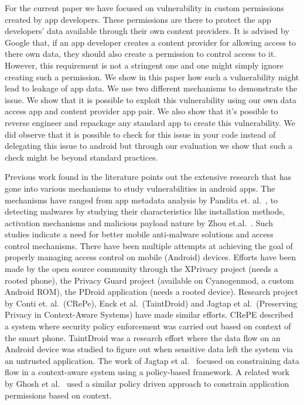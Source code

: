 For the current paper we have focused on vulnerability in custom permissions created by app developers. These permissions are there to protect the app developers' data available through their own content providers. It is advised by Google that, if an app developer creates a content provider for allowing access to there own data, they should also create a permission to control access to it. However, this requirement is not a stringent one and one might simply ignore creating such a permission. We show in this paper how such a vulnerability might lead to leakage of app data. We use two different mechanisms to demonstrate the issue. We show that it is possible to exploit this vulnerability using our own data access app and content provider app pair. We also show that it's possible to reverse engineer and repackage any standard app to create this vulnerability. We did observe that it is possible to check for this issue in your code instead of delegating this issue to android but through our evaluation we show that such a check might be beyond standard practices. 

Previous work found in the literature points out the extensive research that has gone into various mechanisms to study vulnerabilities in android apps. The mechanisms have ranged from app metadata analysis by Pandita et. al.~\cite{Pandita2013Whyper}, to detecting malwares by studying their characteristics like installation methods, activation mechanisms and malicious payload nature by Zhou et.al.~\cite{Zhou2012MalwareGenomeProject}. Such studies indicate a need for better mobile anti-malware solutions and access control mechanisms. There have been multiple attempts at achieving the goal of properly managing access control on mobile (Android) devices. Efforts have been made by the open source community through the XPrivacy project (needs a rooted phone), the Privacy Guard project (available on Cyanogenmod, a custom Android ROM), the PDroid application (needs a rooted device). Research project by Conti et. al.~\cite{conti2011crepe}(CRePe), Enck et al.~\cite{enck2010taintdroid}(TaintDroid) and Jagtap et al.~\cite{Jagtap2011Privacy}(Preserving Privacy in Context-Aware Systems) have made similar efforts. CRePE described a system where security policy enforcement was carried out based on context of the smart phone. TaintDroid was a research effort where the data flow on an Android device was studied to figure out when sensitive data left the system via an untrusted application. The work of Jagtap et al.~\cite{Jagtap2011Privacy} focused on constraining data flow in a context-aware system using a policy-based framework. A related work by Ghosh et al.~\cite{ghosh2012privacy} used a similar policy driven approach to constrain application permissions based on context. 

